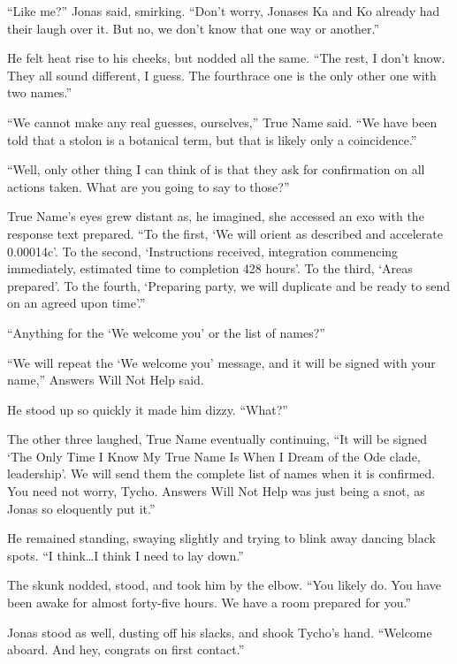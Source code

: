 ``Like me?'' Jonas said, smirking. ``Don't worry, Jonases Ka and Ko already had their laugh over it. But no, we don't know that one way or another.''

He felt heat rise to his cheeks, but nodded all the same. ``The rest, I don't know. They all sound different, I guess. The fourthrace one is the only other one with two names.''

``We cannot make any real guesses, ourselves,'' True Name said. ``We have been told that a stolon is a botanical term, but that is likely only a coincidence.''

``Well, only other thing I can think of is that they ask for confirmation on all actions taken. What are you going to say to those?''

True Name's eyes grew distant as, he imagined, she accessed an exo with the response text prepared. ``To the first, `We will orient as described and accelerate 0.00014c'. To the second, `Instructions received, integration commencing immediately, estimated time to completion 428 hours'. To the third, `Areas prepared'. To the fourth, `Preparing party, we will duplicate and be ready to send on an agreed upon time'.''

``Anything for the `We welcome you' or the list of names?''

``We will repeat the `We welcome you' message, and it will be signed with your name,'' Answers Will Not Help said.

He stood up so quickly it made him dizzy. ``What?''

The other three laughed, True Name eventually continuing, ``It will be signed `The Only Time I Know My True Name Is When I Dream of the Ode clade, leadership'. We will send them the complete list of names when it is confirmed. You need not worry, Tycho. Answers Will Not Help was just being a snot, as Jonas so eloquently put it.''

He remained standing, swaying slightly and trying to blink away dancing black spots. ``I think\ldots I think I need to lay down.''

The skunk nodded, stood, and took him by the elbow. ``You likely do. You have been awake for almost forty-five hours. We have a room prepared for you.''

Jonas stood as well, dusting off his slacks, and shook Tycho's hand. ``Welcome aboard. And hey, congrats on first contact.''
